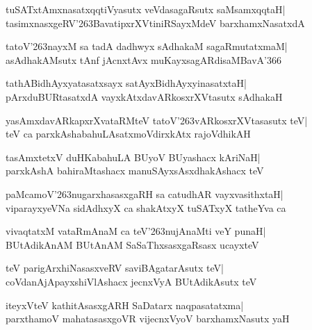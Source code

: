 \documentclass[twoside,12pt,openright]{book}
\def\S{\char'263}
\newcounter{shloka}[chapter]
\begin{document}
\begin{shloka}%
tuSATxtAmxnasatxqqtiVyasutx veVdasagaRsutx saMsamxqqtaH|\\
tasimxnasxgeRV\S BavatipxrXVtiniRSayxMdeV barxhamxNasatxdA
\end{shloka}

\begin{shloka}%
tatoV\S nayxM sa tadA dadhwyx sAdhakaM sagaRmutatxmaM|\\
asAdhakAMsutx tAnf jAcnxtAvx muKayxsagARdisaMBavA\char'366
\end{shloka}

\begin{shloka}%
tathABidhAyxyatasatxsayx satAyxBidhAyxyinasatxtaH|\\
pArxduBURtasatxdA vayxkAtxdavARkosxrXVtasutx sAdhakaH
\end{shloka}

\begin{shloka}%
yasAmxdavARkapxrXvataRMteV tatoV\S vARkosxrXVtasasutx teV|\\
teV ca parxkAshabahuLAsatxmoVdirxkAtx rajoVdhikAH
\end{shloka}

\begin{shloka}%
tasAmxtetxV duHKabahuLA BUyoV BUyashacx kAriNaH|\\
parxkAshA bahiraMtashacx manuSAyxsAsxdhakAshacx teV
\end{shloka}

\begin{shloka}%
paMcamoV\S nugarxhasasxgaRH sa catudhAR vayxvasithxtaH|\\
viparayxyeVNa sidAdhxyX ca shakAtxyX tuSATxyX tatheYva ca
\end{shloka}

\begin{shloka}%
vivaqtatxM vataRmAnaM ca teV\S nujAnaMti veY punaH|\\
BUtAdikAnAM BUtAnAM SaSaThxsasxgaRsasx ucayxteV
\end{shloka}

\begin{shloka}%
teV parigArxhiNasasxveRV saviBAgatarAsutx teV|\\
coVdanAjApayxshiVlAshacx jecnxVyA BUtAdikAsutx teV
\end{shloka}

\begin{shloka}%
iteyxVteV kathitAsasxgARH SaDatarx naqpasatatxma|\\
parxthamoV mahatasasxgoVR vijecnxVyoV barxhamxNasutx yaH
\end{shloka}
\end{document}
